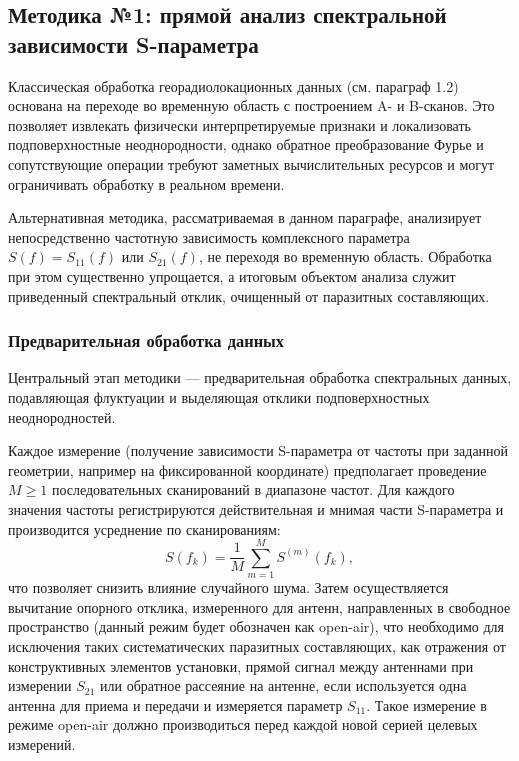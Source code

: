 \subsection{Методика №1: прямой анализ спектральной зависимости S-параметра}

Классическая обработка георадиолокационных данных (см. параграф 1.2) основана на переходе во временную область с построением A- и B-сканов. Это позволяет извлекать физически интерпретируемые признаки и локализовать подповерхностные неоднородности, однако обратное преобразование Фурье и сопутствующие операции требуют заметных вычислительных ресурсов и могут ограничивать обработку в реальном времени.

Альтернативная методика, рассматриваемая в данном параграфе, анализирует непосредственно частотную зависимость комплексного параметра $S(f) = S_{11}(f)$ или $S_{21}(f)$, не переходя во временную область. Обработка при этом существенно упрощается, а итоговым объектом анализа служит приведенный спектральный отклик, очищенный от паразитных составляющих.

\subsubsection{Предварительная обработка данных}

Центральный этап методики --- предварительная обработка спектральных данных, подавляющая флуктуации и выделяющая отклики подповерхностных неоднородностей.

Каждое измерение (получение зависимости S-параметра от частоты при заданной геометрии, например на фиксированной координате) предполагает проведение $M \geq 1$ последовательных сканирований в диапазоне частот. Для каждого значения частоты регистрируются действительная и мнимая части S-параметра и производится усреднение по сканированиям:
\begin{equation}
    S(f_k) = \frac{1}{M}\sum_{m=1}^{M} S^{(m)}(f_k),
\end{equation}
что позволяет снизить влияние случайного шума. Затем осуществляется вычитание опорного отклика, измеренного для антенн, направленных в свободное пространство (данный режим будет обозначен как open-air), что необходимо для исключения таких систематических паразитных составляющих, как отражения от конструктивных элементов установки, прямой сигнал между антеннами при измерении $S_{21}$ или обратное рассеяние на антенне, если используется одна антенна для приема и передачи и измеряется параметр $S_{11}$. Такое измерение в режиме open-air должно производиться перед каждой новой серией целевых измерений.

